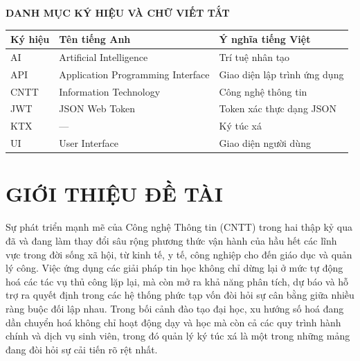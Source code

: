 ﻿\documentclass[a4paper,12pt,openany,oneside]{report}
\begin{document}
\clearpage
\tableofcontents

\clearpage
\begin{center}
    {\bfseries\fontsize{18pt}{22pt}\selectfont
        DANH MỤC KÝ HIỆU VÀ CHỮ VIẾT TẮT}
\end{center}
\vspace{1cm}

\begin{longtable}{p{3cm} p{5cm} p{6cm}}
    \toprule
    \textbf{Ký hiệu} & \textbf{Tên tiếng Anh} & \textbf{Ý nghĩa tiếng Việt} \\
    \midrule
    \endhead
    AI   & Artificial Intelligence           & Trí tuệ nhân tạo \\[3pt]
    API  & Application Programming Interface & Giao diện lập trình ứng dụng \\[3pt]
    CNTT & Information Technology            & Công nghệ thông tin \\[3pt]
    JWT  & JSON Web Token                    & Token xác thực dạng JSON \\[3pt]
    KTX  & ---                               & Ký túc xá \\[3pt]
    UI   & User Interface                    & Giao diện người dùng \\
    \bottomrule
\end{longtable}

\clearpage
\renewcommand{\listfigurename}{%
    \bfseries\fontsize{18pt}{22pt}\selectfont DANH MỤC HÌNH VẼ%
}
\listoffigures

\clearpage
\renewcommand{\listtablename}{%
    \bfseries\fontsize{18pt}{22pt}\selectfont DANH MỤC BẢNG%
}
\listoftables

\clearpage
\chapter{GIỚI THIỆU ĐỀ TÀI}

Sự phát triển mạnh mẽ của Công nghệ Thông tin (CNTT) trong hai thập kỷ qua đã
và đang làm thay đổi sâu rộng phương thức vận hành của hầu hết các lĩnh vực
trong đời sống xã hội, từ kinh tế, y tế, công nghiệp cho đến giáo dục và quản
lý công. Việc ứng dụng các giải pháp tin học không chỉ dừng lại ở mức tự động
hoá các tác vụ thủ công lặp lại, mà còn mở ra khả năng phân tích, dự báo và hỗ
trợ ra quyết định trong các hệ thống phức tạp vốn đòi hỏi sự cân bằng giữa
nhiều ràng buộc đối lập nhau. Trong bối cảnh đào tạo đại học, xu hướng số hoá
đang dần chuyển hoá không chỉ hoạt động dạy và học mà còn cả các quy trình hành
chính và dịch vụ sinh viên, trong đó quản lý ký túc xá là một trong những mảng
đang đòi hỏi sự cải tiến rõ rệt nhất.
\end{document}
